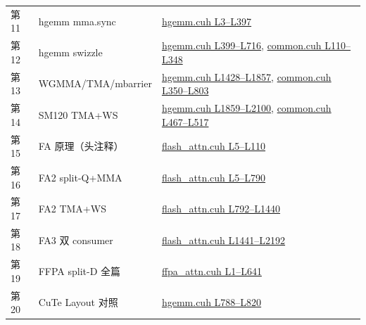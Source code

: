 \begin{longtable}{llp{7.2cm}}
第11 & hgemm mma.sync & \href{https://github.com/xlite-dev/LeetCUDA/blob/6cd32deca683d6c4aae2011988c9f4a35bc5f528/kernels/interview/hgemm.cuh#L3-L397}{hgemm.cuh L3--L397} \\
第12 & hgemm swizzle & \href{https://github.com/xlite-dev/LeetCUDA/blob/6cd32deca683d6c4aae2011988c9f4a35bc5f528/kernels/interview/hgemm.cuh#L399-L716}{hgemm.cuh L399--L716}, \href{https://github.com/xlite-dev/LeetCUDA/blob/6cd32deca683d6c4aae2011988c9f4a35bc5f528/kernels/interview/common.cuh#L110-L348}{common.cuh L110--L348} \\
第13 & WGMMA/TMA/mbarrier & \href{https://github.com/xlite-dev/LeetCUDA/blob/6cd32deca683d6c4aae2011988c9f4a35bc5f528/kernels/interview/hgemm.cuh#L1428-L1857}{hgemm.cuh L1428--L1857}, \href{https://github.com/xlite-dev/LeetCUDA/blob/6cd32deca683d6c4aae2011988c9f4a35bc5f528/kernels/interview/common.cuh#L350-L803}{common.cuh L350--L803} \\
第14 & SM120 TMA+WS & \href{https://github.com/xlite-dev/LeetCUDA/blob/6cd32deca683d6c4aae2011988c9f4a35bc5f528/kernels/interview/hgemm.cuh#L1859-L2100}{hgemm.cuh L1859--L2100}, \href{https://github.com/xlite-dev/LeetCUDA/blob/6cd32deca683d6c4aae2011988c9f4a35bc5f528/kernels/interview/common.cuh#L467-L517}{common.cuh L467--L517} \\
第15 & FA 原理（头注释） & \href{https://github.com/xlite-dev/LeetCUDA/blob/6cd32deca683d6c4aae2011988c9f4a35bc5f528/kernels/interview/flash_attn.cuh#L5-L110}{flash\_attn.cuh L5--L110} \\
第16 & FA2 split-Q+MMA & \href{https://github.com/xlite-dev/LeetCUDA/blob/6cd32deca683d6c4aae2011988c9f4a35bc5f528/kernels/interview/flash_attn.cuh#L5-L790}{flash\_attn.cuh L5--L790} \\
第17 & FA2 TMA+WS & \href{https://github.com/xlite-dev/LeetCUDA/blob/6cd32deca683d6c4aae2011988c9f4a35bc5f528/kernels/interview/flash_attn.cuh#L792-L1440}{flash\_attn.cuh L792--L1440} \\
第18 & FA3 双 consumer & \href{https://github.com/xlite-dev/LeetCUDA/blob/6cd32deca683d6c4aae2011988c9f4a35bc5f528/kernels/interview/flash_attn.cuh#L1441-L2192}{flash\_attn.cuh L1441--L2192} \\
第19 & FFPA split-D 全篇 & \href{https://github.com/xlite-dev/LeetCUDA/blob/6cd32deca683d6c4aae2011988c9f4a35bc5f528/kernels/interview/ffpa_attn.cuh#L1-L641}{ffpa\_attn.cuh L1--L641} \\
第20 & CuTe Layout 对照 & \href{https://github.com/xlite-dev/LeetCUDA/blob/6cd32deca683d6c4aae2011988c9f4a35bc5f528/kernels/interview/hgemm.cuh#L788-L820}{hgemm.cuh L788--L820} \\

\end{longtable}
